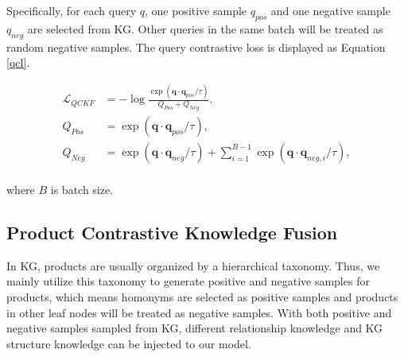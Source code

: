 

Specifically, for each query $q$, one positive sample $q_{pos}$ and one negative sample $q_{neg}$ are selected from KG. Other queries in the same batch will be treated as random negative samples. The query contrastive loss is displayed as Equation \ref{qcl}.



\begin{equation}
    \label{qcl}
    \begin{aligned}
    \mathcal{L}_{QCKF}&=-{\log\frac{\exp(\mathbf{q}\cdot\mathbf{q}_{pos}/\tau)}{Q_{Pos}+Q_{Neg}}}. \\
    Q_{Pos}&={\exp(\mathbf{q}\cdot\mathbf{q}_{pos}/\tau)}, \\
    Q_{Neg}&={\exp(\mathbf{q}\cdot\mathbf{q}_{neg}/\tau)} + \sum_{i=1}^{B-1}
    {\exp(\mathbf{q}\cdot\mathbf{q}_{neg, i}/\tau)},\\
    \end{aligned}
\end{equation}

\noindent where $B$ is batch size.

\subsection{Product Contrastive Knowledge Fusion}
In KG, products are usually organized by a hierarchical taxonomy. Thus, we mainly utilize this taxonomy to generate positive and negative samples for products, which means homonyms are selected as positive samples and products in other leaf nodes will be treated as negative samples. With both positive and negative samples sampled from KG, different relationship knowledge and KG structure knowledge can be injected to our model.


